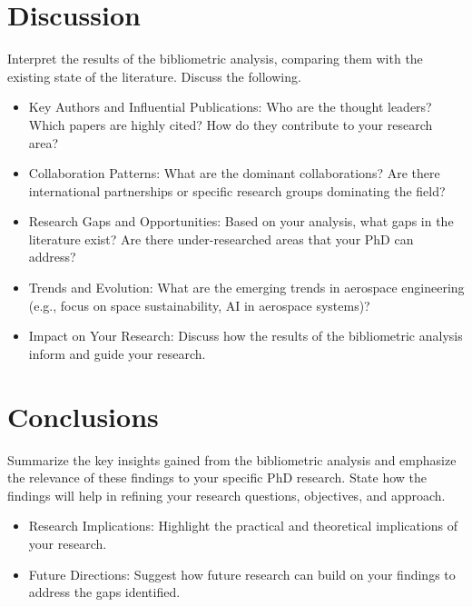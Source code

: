 \documentclass[journal ]{new-aiaa}
\begin{document}
\section{Discussion}

Interpret the results of the bibliometric analysis, comparing them with the existing state of the literature. Discuss the following.

\begin{itemize}
    \item Key Authors and Influential Publications: Who are the thought leaders? Which papers are highly cited? How do they contribute to your research area?
    \item Collaboration Patterns: What are the dominant collaborations? Are there international partnerships or specific research groups dominating the field?
    \item Research Gaps and Opportunities: Based on your analysis, what gaps in the literature exist? Are there under-researched areas that your PhD can address?
    \item Trends and Evolution: What are the emerging trends in aerospace engineering (e.g., focus on space sustainability, AI in aerospace systems)?
    \item Impact on Your Research: Discuss how the results of the bibliometric analysis inform and guide your research.
\end{itemize}

\section{Conclusions}

Summarize the key insights gained from the bibliometric analysis and emphasize the relevance of these findings to your specific PhD research. State how the findings will help in refining your research questions, objectives, and approach.

\begin{itemize}
    \item Research Implications: Highlight the practical and theoretical implications of your research.
    \item Future Directions: Suggest how future research can build on your findings to address the gaps identified.
\end{itemize}



\end{document}
